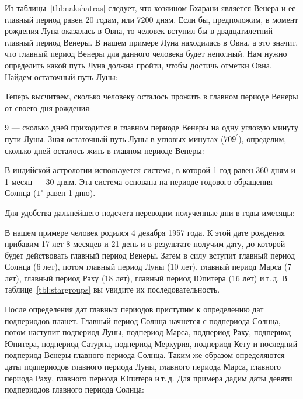 Из таблицы~\ref{tbl:nakshatras} следует, что хозяином Бхарани является Венера и ее главный период равен 20 годам, или 7200 дням. Если бы, предположим, в момент рождения Луна оказалась в  Овна, то человек вступил бы в двадцатилетний главный период Венеры. В нашем примере Луна находилась в  Овна, а это значит, что главный период Венеры для данного человека будет неполный. Нам нужно определить какой путь Луна должна пройти, чтобы достичь отметки  Овна. Найдем остаточный путь Луны:


Теперь высчитаем, сколько человеку осталось прожить в главном периоде Венеры от своего дня рождения:


9 --- сколько дней приходится в главном периоде Венеры на одну угловую минуту пути Луны. Зная остаточный путь Луны в угловых минутах (\(709^\prime\)), определим, сколько дней осталось жить в главном периоде Венеры:


В индийской астрологии используется система, в которой 1 год равен 360 дням и 1 месяц --- 30 дням. Эта система основана на периоде годового обращения Солнца (\(1^\circ\) равен 1 дню).

Для удобства дальнейшего подсчета переводим полученные дни в годы имесяцы:


В нашем примере человек родился 4 декабря 1957 года. К этой дате рождения прибавим 17 лет 8 месяцев и 21 день и в результате получим дату, до которой будет действовать главный период Венеры. Затем в силу вступит главный период Солнца (6 лет), потом главный период Луны (10 лет), главный период Марса (7 лет), главный период Раху (18 лет), главный период Юпитера (16 лет) и\,т.\,д. В таблице~\ref{tbl:stargroups} вы увидите их последовательность.

После определения дат главных периодов приступим к определению дат подпериодов планет. Главный период Солнца начнется с подпериода Солнца, потом наступит подпериод Луны, подпериод Марса, подпериод Раху, подпериод Юпитера, подпериод Сатурна, подпериод Меркурия, подпериод Кету и последний подпериод Венеры главного периода Солнца. Таким же образом определяются даты подпериодов главного периода Луны, главного периода Марса, главного периода Раху, главного периода Юпитера и\,т.\,д. Для примера дадим даты девяти подпериодов главного периода Солнца:

